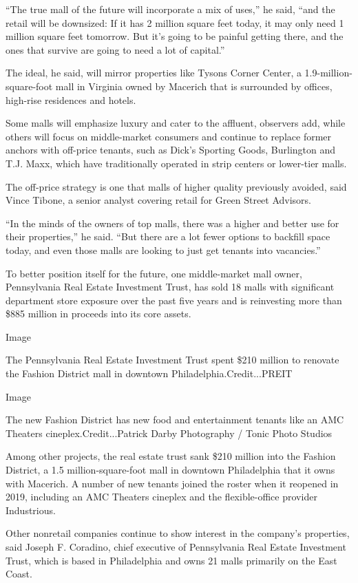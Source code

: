 ``The true mall of the future will incorporate a mix of uses,'' he said,
``and the retail will be downsized: If it has 2 million square feet
today, it may only need 1 million square feet tomorrow. But it's going
to be painful getting there, and the ones that survive are going to need
a lot of capital.''

The ideal, he said, will mirror properties like Tysons Corner Center, a
1.9-million-square-foot mall in Virginia owned by Macerich that is
surrounded by offices, high-rise residences and hotels.

Some malls will emphasize luxury and cater to the affluent, observers
add, while others will focus on middle-market consumers and continue to
replace former anchors with off-price tenants, such as Dick's Sporting
Goods, Burlington and T.J. Maxx, which have traditionally operated in
strip centers or lower-tier malls.

The off-price strategy is one that malls of higher quality previously
avoided, said Vince Tibone, a senior analyst covering retail for Green
Street Advisors.

``In the minds of the owners of top malls, there was a higher and better
use for their properties,'' he said. ``But there are a lot fewer options
to backfill space today, and even those malls are looking to just get
tenants into vacancies.''

To better position itself for the future, one middle-market mall owner,
Pennsylvania Real Estate Investment Trust, has sold 18 malls with
significant department store exposure over the past five years and is
reinvesting more than \$885 million in proceeds into its core assets.

Image

The Pennsylvania Real Estate Investment Trust spent \$210 million to
renovate the Fashion District mall in downtown
Philadelphia.Credit...PREIT

Image

The new Fashion District has new food and entertainment tenants like an
AMC Theaters cineplex.Credit...Patrick Darby Photography / Tonic Photo
Studios

Among other projects, the real estate trust sank \$210 million into the
Fashion District, a 1.5 million-square-foot mall in downtown
Philadelphia that it owns with Macerich. A number of new tenants joined
the roster when it reopened in 2019, including an AMC Theaters cineplex
and the flexible-office provider Industrious.

Other nonretail companies continue to show interest in the company's
properties, said Joseph F. Coradino, chief executive of Pennsylvania
Real Estate Investment Trust, which is based in Philadelphia and owns 21
malls primarily on the East Coast.

